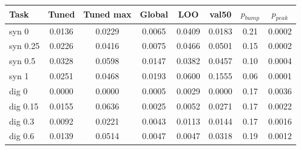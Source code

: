 \begin{tabular}{lccccccc}\hline
Task & Tuned & Tuned max & Global & LOO & val50 & $p_{bump}$ & $p_{peak}$ \\ \hline
syn 0 & 0.0136 & 0.0229 & 0.0065 & 0.0409 & 0.0183 & 0.21 & 0.0002 \\
syn 0.25 & 0.0226 & 0.0416 & 0.0075 & 0.0466 & 0.0501 & 0.15 & 0.0002 \\
syn 0.5 & 0.0328 & 0.0598 & 0.0147 & 0.0382 & 0.0457 & 0.10 & 0.0004 \\
syn 1 & 0.0251 & 0.0468 & 0.0193 & 0.0600 & 0.1555 & 0.06 & 0.0001 \\
dig 0 & 0.0000 & 0.0000 & 0.0005 & 0.0029 & 0.0000 & 0.17 & 0.0036 \\
dig 0.15 & 0.0155 & 0.0636 & 0.0025 & 0.0052 & 0.0271 & 0.17 & 0.0022 \\
dig 0.3 & 0.0092 & 0.0221 & 0.0043 & 0.0113 & 0.0144 & 0.17 & 0.0016 \\
dig 0.6 & 0.0139 & 0.0514 & 0.0047 & 0.0047 & 0.0318 & 0.19 & 0.0012 \\
\hline\end{tabular}
